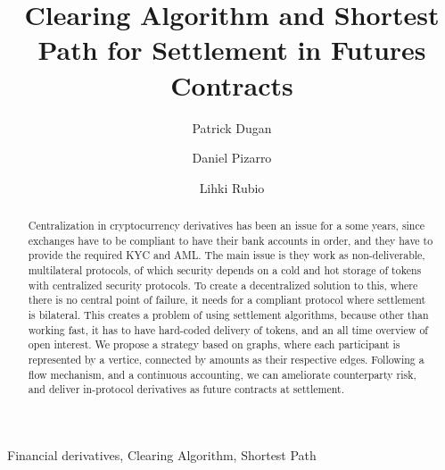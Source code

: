 \documentclass[preprint,reqno,12pt]{elsarticle}
\theoremstyle{definition}
\numberwithin{equation}{section}
\begin{document}
\begin{frontmatter}  
   
\title{Clearing Algorithm and Shortest Path for Settlement in Futures Contracts}    

\author[pd]{Patrick Dugan}  
\author[dp]{Daniel Pizarro}  
\author[rb]{Lihki Rubio}  
  
  
\address[pd]{Tradelayer, Conc\'{o}n, Valparaiso, Chile}   
  
\begin{abstract}

Centralization in cryptocurrency derivatives has been an issue for a some years, since exchanges have to be compliant to have their bank accounts in order, and they have to provide the required KYC and AML. The main issue is they work as non-deliverable, multilateral protocols, of which security depends on a cold and hot storage of tokens with centralized security protocols. To create a decentralized solution to this, where there is no central point of failure, it needs for a compliant protocol where settlement is bilateral. This creates a problem of using settlement algorithms, because other than working fast, it has to have hard-coded delivery of tokens, and an all time overview of open interest. We propose a strategy based on graphs, where each participant is represented by a vertice, connected by amounts as their respective edges. Following a flow mechanism, and a continuous accounting, we can ameliorate counterparty risk, and deliver in-protocol derivatives as future contracts at settlement.

\end{abstract} 
   
\begin{keyword} 
Financial derivatives, Clearing Algorithm, Shortest Path  
\end{keyword}
 
\end{frontmatter} 








\newpage


 
  
\end{document}

